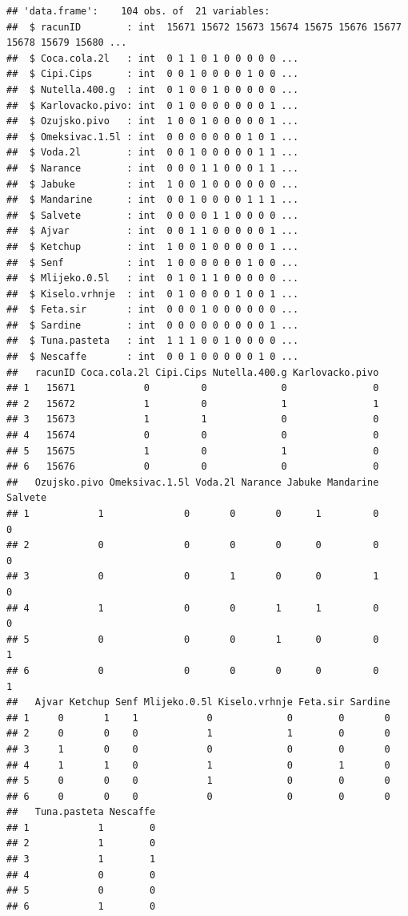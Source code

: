 \documentclass[]{book}
\theoremstyle{definition}
\theoremstyle{definition}
\theoremstyle{definition}
\theoremstyle{remark}
\begin{document}
\begin{verbatim}
## 'data.frame':    104 obs. of  21 variables:
##  $ racunID        : int  15671 15672 15673 15674 15675 15676 15677 15678 15679 15680 ...
##  $ Coca.cola.2l   : int  0 1 1 0 1 0 0 0 0 0 ...
##  $ Cipi.Cips      : int  0 0 1 0 0 0 0 1 0 0 ...
##  $ Nutella.400.g  : int  0 1 0 0 1 0 0 0 0 0 ...
##  $ Karlovacko.pivo: int  0 1 0 0 0 0 0 0 0 1 ...
##  $ Ozujsko.pivo   : int  1 0 0 1 0 0 0 0 0 1 ...
##  $ Omeksivac.1.5l : int  0 0 0 0 0 0 0 1 0 1 ...
##  $ Voda.2l        : int  0 0 1 0 0 0 0 0 1 1 ...
##  $ Narance        : int  0 0 0 1 1 0 0 0 1 1 ...
##  $ Jabuke         : int  1 0 0 1 0 0 0 0 0 0 ...
##  $ Mandarine      : int  0 0 1 0 0 0 0 1 1 1 ...
##  $ Salvete        : int  0 0 0 0 1 1 0 0 0 0 ...
##  $ Ajvar          : int  0 0 1 1 0 0 0 0 0 1 ...
##  $ Ketchup        : int  1 0 0 1 0 0 0 0 0 1 ...
##  $ Senf           : int  1 0 0 0 0 0 0 1 0 0 ...
##  $ Mlijeko.0.5l   : int  0 1 0 1 1 0 0 0 0 0 ...
##  $ Kiselo.vrhnje  : int  0 1 0 0 0 0 1 0 0 1 ...
##  $ Feta.sir       : int  0 0 0 1 0 0 0 0 0 0 ...
##  $ Sardine        : int  0 0 0 0 0 0 0 0 0 1 ...
##  $ Tuna.pasteta   : int  1 1 1 0 0 1 0 0 0 0 ...
##  $ Nescaffe       : int  0 0 1 0 0 0 0 0 1 0 ...
##   racunID Coca.cola.2l Cipi.Cips Nutella.400.g Karlovacko.pivo
## 1   15671            0         0             0               0
## 2   15672            1         0             1               1
## 3   15673            1         1             0               0
## 4   15674            0         0             0               0
## 5   15675            1         0             1               0
## 6   15676            0         0             0               0
##   Ozujsko.pivo Omeksivac.1.5l Voda.2l Narance Jabuke Mandarine Salvete
## 1            1              0       0       0      1         0       0
## 2            0              0       0       0      0         0       0
## 3            0              0       1       0      0         1       0
## 4            1              0       0       1      1         0       0
## 5            0              0       0       1      0         0       1
## 6            0              0       0       0      0         0       1
##   Ajvar Ketchup Senf Mlijeko.0.5l Kiselo.vrhnje Feta.sir Sardine
## 1     0       1    1            0             0        0       0
## 2     0       0    0            1             1        0       0
## 3     1       0    0            0             0        0       0
## 4     1       1    0            1             0        1       0
## 5     0       0    0            1             0        0       0
## 6     0       0    0            0             0        0       0
##   Tuna.pasteta Nescaffe
## 1            1        0
## 2            1        0
## 3            1        1
## 4            0        0
## 5            0        0
## 6            1        0
\end{verbatim}
\end{document}
